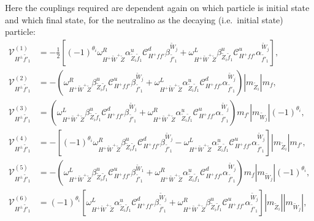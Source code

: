 \documentclass[final,3p,times,pdflatex]{elsarticle}
\begin{document}
Here the couplings required are dependent again on which particle is initial state and which final state, for the neutralino as the decaying (i.e.\ initial state) particle:
\begin{align}
\mathcal{V}_{H^{\pm} \tilde{f'}_1}^{(1)} &= -\frac{1}{2}[(-1)^{\theta_i}\omega_{H^+ \tilde{W}^+ \tilde{Z}}^R \alpha_{\tilde{Z}_i \tilde{f}_1}^{u} \mathcal{C}_{H^+ f f'}^d \beta_{\tilde{f'}_1}^{\tilde{W}_j} + \omega_{H^+ \tilde{W}^+ \tilde{Z}}^L \beta_{\tilde{Z}_i \tilde{f}_1}^{u} \mathcal{C}_{H^+ f f'}^u \alpha_{\tilde{f'}_1}^{\tilde{W}_j}], \\
\mathcal{V}_{H^{\pm} \tilde{f'}_1}^{(2)} &= -(\omega_{H^+ \tilde{W}^+ \tilde{Z}}^R \beta_{\tilde{Z}_i \tilde{f}_1}^{u} \mathcal{C}_{H^+ f f'}^u \beta_{\tilde{f'}_1}^{\tilde{W}_j} + \omega_{H^+ \tilde{W}^+ \tilde{Z}}^L \alpha_{\tilde{Z}_i \tilde{f}_1}^{u} \mathcal{C}_{H^+ f f'}^d \alpha_{\tilde{f'}_1}^{\tilde{W}_j})|m_{\tilde{Z}_i}|m_{f}, \\
\mathcal{V}_{H^{\pm} \tilde{f'}_1}^{(3)} &= (\omega_{H^+ \tilde{W}^+ \tilde{Z}}^L \beta_{\tilde{Z}_i \tilde{f}_1}^{u} \mathcal{C}_{H^+ f f'}^d \beta_{\tilde{f'}_1}^{\tilde{W}_j} + \omega_{H^+ \tilde{W}^+ \tilde{Z}}^R \alpha_{\tilde{Z}_i \tilde{f}_1}^{u} \mathcal{C}_{H^+ f f'}^u \alpha_{\tilde{f'}_1}^{\tilde{W}_j})m_{f'}|m_{\tilde{W}_j}|(-1)^{\theta_i}, \\
\mathcal{V}_{H^{\pm} \tilde{f'}_1}^{(4)} &= -[(-1)^{\theta_i}\omega_{H^+ \tilde{W}^+ \tilde{Z}}^R \beta_{\tilde{Z}_i \tilde{f}_1}^{u} \mathcal{C}_{H^+ f f'}^d \beta_{\tilde{f'}_1}^{\tilde{W}_j} - \omega_{H^+ \tilde{W}^+ \tilde{Z}}^L \alpha_{\tilde{Z}_i \tilde{f}_1}^{u} \mathcal{C}_{H^+ f f'}^u \alpha_{\tilde{f'}_1}^{\tilde{W}_j}]|m_{\tilde{Z}_i}|m_{f'}, \\
\mathcal{V}_{H^{\pm} \tilde{f'}_1}^{(5)} &= -(\omega_{H^+ \tilde{W}^+ \tilde{Z}}^L \beta_{\tilde{Z}_i \tilde{f}_1}^{u} \mathcal{C}_{H^+ f f'}^u \beta_{\tilde{f'}_1}^{\tilde{W}_1} + \omega_{H^+ \tilde{W}^+ \tilde{Z}}^R \alpha_{\tilde{Z}_i \tilde{f}_1}^{u} \mathcal{C}_{H^+ f f'}^d \alpha_{\tilde{f'}_1}^{\tilde{W}_j})m_{f}|m_{\tilde{W}_j}|(-1)^{\theta_i}, \\
\mathcal{V}_{H^{\pm} \tilde{f'}_1}^{(6)} &= (-1)^{\theta_i}[\omega_{H^+ \tilde{W}^+ \tilde{Z}}^L \alpha_{\tilde{Z}_i \tilde{f}_1}^{u} \mathcal{C}_{H^+ f f'}^d \beta_{\tilde{f'}_1}^{\tilde{W}_j} + \omega_{H^+ \tilde{W}^+ \tilde{Z}}^R \beta_{\tilde{Z}_i \tilde{f}_1}^{u} \mathcal{C}_{H^+ f f'}^u \alpha_{\tilde{f'}_1}^{\tilde{W}_j}]|m_{\tilde{Z}_i}||m_{\tilde{W}_j}|, \\

\end{align}
\end{document}
